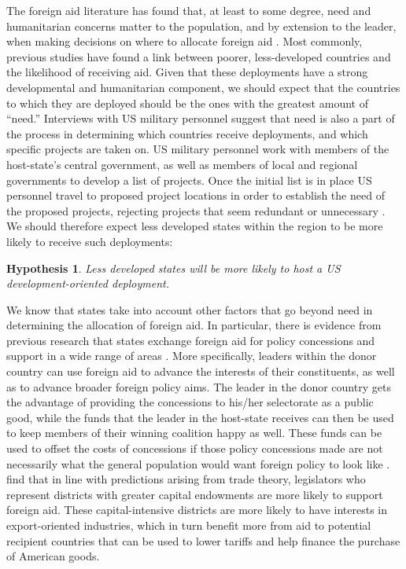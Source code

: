 \documentclass[12pt]{article}
\newtheorem{hyp}{Hypothesis}
\begin{document}
\begin{doublespace}
The foreign aid literature has found that, at least to some degree, need and humanitarian concerns matter to the population, and by extension to the leader, when making decisions on where to allocate foreign aid \cite{AlesinaDollar2000,drury2005politics,lumsdaine1993moral,van2004media}. Most commonly, previous studies have found a link between poorer, less-developed countries and the likelihood of receiving aid. Given that these deployments have a strong developmental and humanitarian component, we should expect that the countries to which they are deployed should be the ones with the greatest amount  of ``need.'' Interviews with US military personnel suggest that need is also a part of the process in determining which countries receive deployments, and which specific projects are taken on. US military personnel work with members of the host-state's central government, as well as members of local and regional governments to develop a list of projects. Once the initial list is in place US personnel travel to proposed project locations in order to establish the need of the proposed projects, rejecting projects that seem redundant or unnecessary \cite{CPT20160309}.  We should therefore expect less developed states within the region to be more likely to receive such deployments: 

\begin{hyp}
Less developed states will be more likely to host a US development-oriented deployment.
\end{hyp}

We know that states take into account other factors that go beyond need in determining the allocation of foreign aid. In particular, there is evidence from previous research that states exchange foreign aid for policy concessions and support in a wide range of areas \cite{LaiMorey2006,de2007foreign,Faye12,MilnerTingley2010,FleckKilby2006}. More specifically, leaders within the donor country can use foreign aid to advance the interests of their constituents, as well as to advance broader foreign policy aims. The leader in the donor country gets the advantage of providing the concessions to his/her selectorate as a public good, while the funds that the leader in the host-state receives can then be used to keep members of their winning coalition happy as well. These funds can be used to offset the costs of concessions if those policy concessions made are not necessarily what the general population would want foreign policy to look like \cite{de2007foreign}.  find that in line with predictions arising from trade theory, legislators who represent districts with greater capital endowments are more likely to support foreign aid. These capital-intensive districts are more likely to have interests in export-oriented industries, which in turn benefit more from aid to potential recipient countries that can be used to lower tariffs and help finance the purchase of American goods.    


\end{doublespace}
\end{document}
